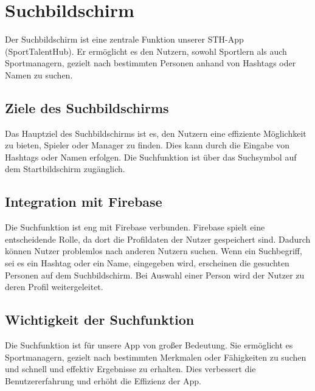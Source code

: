 \chapter{Suchbildschirm}

Der Suchbildschirm ist eine zentrale Funktion unserer STH-App (SportTalentHub). Er ermöglicht es den Nutzern, sowohl Sportlern als auch Sportmanagern, gezielt nach bestimmten Personen anhand von Hashtags oder Namen zu suchen.

\section*{Ziele des Suchbildschirms}
Das Hauptziel des Suchbildschirms ist es, den Nutzern eine effiziente Möglichkeit zu bieten, Spieler oder Manager zu finden. Dies kann durch die Eingabe von Hashtags oder Namen erfolgen. Die Suchfunktion ist über das Suchsymbol auf dem Startbildschirm zugänglich.

\section*{Integration mit Firebase}
Die Suchfunktion ist eng mit Firebase verbunden. Firebase spielt eine entscheidende Rolle, da dort die Profildaten der Nutzer gespeichert sind. Dadurch können Nutzer problemlos nach anderen Nutzern suchen. Wenn ein Suchbegriff, sei es ein Hashtag oder ein Name, eingegeben wird, erscheinen die gesuchten Personen auf dem Suchbildschirm. Bei Auswahl einer Person wird der Nutzer zu deren Profil weitergeleitet.

\section*{Wichtigkeit der Suchfunktion}
Die Suchfunktion ist für unsere App von großer Bedeutung. Sie ermöglicht es Sportmanagern, gezielt nach bestimmten Merkmalen oder Fähigkeiten zu suchen und schnell und effektiv Ergebnisse zu erhalten. Dies verbessert die Benutzererfahrung und erhöht die Effizienz der App.

